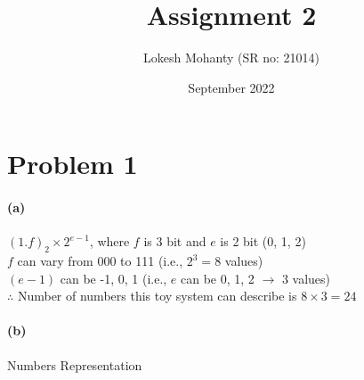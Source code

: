 \documentclass[12pt, letterpaper]{article}
\title{Assignment 2}
\author{Lokesh Mohanty (SR no: 21014)}
\date{September 2022}
\begin{document}
\fontsize{14pt}{18pt}\selectfont

\maketitle

\section*{Problem 1}
\label{sec:prob1}

\paragraph{(a)} $(1.f)_2 \times 2^{e-1}$, where $f$ is 3 bit and $e$ is 2 bit (0, 1, 2)\\

$f$ can vary from 000 to 111 (i.e., $2^3 = 8$ values)\\
$(e-1)$ can be -1, 0, 1 (i.e., $e$ can be 0, 1, 2 $\rightarrow$ 3 values)\\

$\therefore$ Number of numbers this toy system can describe is $8 \times 3 = 24$

\paragraph{(b)} Numbers Representation
\end{document}
